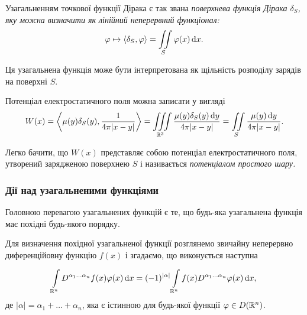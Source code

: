 \begin{definition}
	Узагальненням точкової функції Дірака є так звана \it{поверхнева функція Дірака} $\delta_S$, яку можна визначити як лінійний неперервний функціонал:
	\begin{equation}
		\varphi \mapsto \langle \delta_S, \varphi \rangle = \displaystyle\iint\limits_{S} \varphi(x) \mathop{}\!\mathrm{d} x.	
	\end{equation}
\end{definition}

\begin{remark}
	Ця узагальнена функція може бути інтерпретована як щільність розподілу зарядів на поверхні $S$.
\end{remark}

\begin{example}
	Потенціал електростатичного поля можна записати у вигляді
	\begin{equation}
		W(x) = \left\langle \mu(y) \delta_S(y), \frac{1}{4 \pi |x - y|} \right\rangle = \displaystyle\iiint\limits_{\mathbb{R}^3} \frac{\mu(y) \delta_S(y) \mathop{}\!\mathrm{d} y}{4 \pi |x - y|} = \displaystyle\iint\limits_{S} \frac{\mu(y) \mathop{}\!\mathrm{d} y}{4 \pi |x - y|}.	
	\end{equation}
\end{example}

\begin{definition}
	Легко бачити, що $W(x)$ представляє собою потенціал електростатичного поля, утворений зарядженою поверхнею $S$ і називається \it{потенціалом простого шару}.
\end{definition}

\subsubsection{Дії над узагальненими функціями}

Головною перевагою узагальнених функцій є те, що будь-яка узагальнена функція має похідні будь-якого порядку. \medskip

Для визначення похідної узагальненої функції розглянемо звичайну неперервно диференційовну функцію $f(x)$ і згадаємо, що виконується наступна
\begin{formula}
	\begin{equation}
		\displaystyle\int\limits_{\mathbb{R}^n} D^{\alpha_1 \ldots \alpha_n} f(x) \varphi(x) \mathop{}\!\mathrm{d} x = (-1)^{|\alpha|} \displaystyle\int\limits_{\mathbb{R}^n} f(x) D^{\alpha_1 \ldots \alpha_n} \varphi(x) \mathop{}\!\mathrm{d} x,
	\end{equation}
	де $|\alpha| = \alpha_1 + \ldots + \alpha_n$, яка є істинною для будь-якої функції $\varphi \in D(\mathbb{R}^n)$.
\end{formula}

